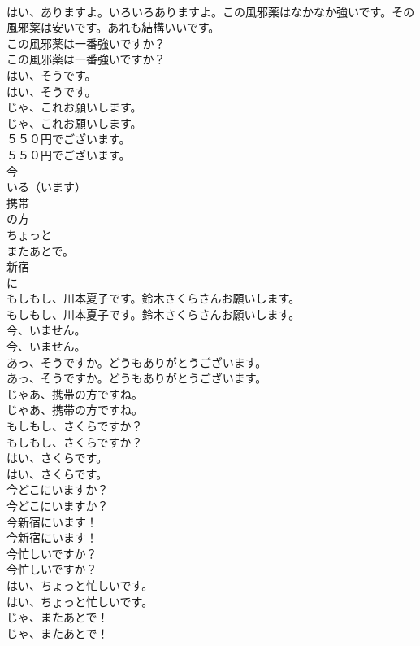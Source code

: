 \documentclass[8pt]{extreport}
\begin{document}
\begin{CJK}{UTF8}{min}
\\	はい、ありますよ。いろいろありますよ。この風邪薬はなかなか強いです。その風邪薬は安いです。あれも結構いいです。 
\\	この風邪薬は一番強いですか？	
\\	この風邪薬は一番強いですか？ 
\\	はい、そうです。	
\\	はい、そうです。 
\\	じゃ、これお願いします。	
\\	じゃ、これお願いします。 
\\	５５０円でございます。	
\\	５５０円でございます。 
\\	今
\\	いる（います）
\\	携帯
\\	の方
\\	ちょっと
\\	またあとで。
\\	新宿
\\	に
\\	もしもし、川本夏子です。鈴木さくらさんお願いします。	
\\	もしもし、川本夏子です。鈴木さくらさんお願いします。 
\\	今、いません。	
\\	今、いません。 
\\	あっ、そうですか。どうもありがとうございます。	
\\	あっ、そうですか。どうもありがとうございます。 
\\	じゃあ、携帯の方ですね。	
\\	じゃあ、携帯の方ですね。 
\\	もしもし、さくらですか？	
\\	もしもし、さくらですか？ 
\\	はい、さくらです。	
\\	はい、さくらです。 
\\	今どこにいますか？	
\\	今どこにいますか？ 
\\	今新宿にいます！	
\\	今新宿にいます！ 
\\	今忙しいですか？	
\\	今忙しいですか？ 
\\	はい、ちょっと忙しいです。	
\\	はい、ちょっと忙しいです。 
\\	じゃ、またあとで！	
\\	じゃ、またあとで！ 

\end{CJK}
\end{document}
